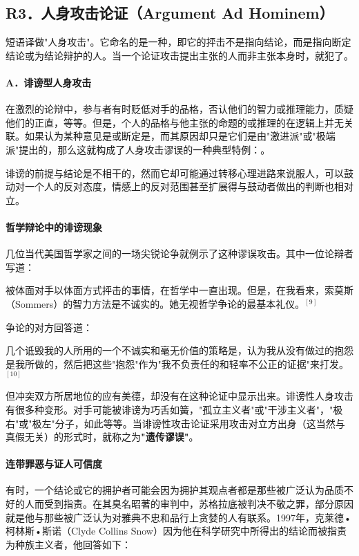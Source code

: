 \subsection{R3．人身攻击论证（Argument Ad Hominem）}

\begin{theorembox}[title=人身攻击论证的定义]
短语译做"人身攻击"。它命名的是一种，即它的抨击不是指向结论，而是指向断定结论或为结论辩护的人。当一个论证攻击提出主张的人而非主张本身时，就犯了。
\end{theorembox}

\paragraph{A．诽谤型人身攻击}

在激烈的论辩中，参与者有时贬低对手的品格，否认他们的智力或推理能力，质疑他们的正直，等等。但是，个人的品格与他主张的命题的或推理的在逻辑上并无关联。如果认为某种意见是或断定是，而其原因却只是它们是由"激进派"或"极端派"提出的，那么这就构成了人身攻击谬误的一种典型特例：。

诽谤的前提与结论是不相干的，然而它却可能通过转移心理进路来说服人，可以鼓动对一个人的反对态度，情感上的反对范围甚至扩展得与鼓动者做出的判断也相对立。

\paragraph{哲学辩论中的诽谤现象}
几位当代美国哲学家之间的一场尖锐论争就例示了这种谬误攻击。其中一位论辩者写道：

被体面对手以体面方式抨击的事情，在哲学中一直出现。但是，在我看来，索莫斯（Sommers）的智力方法是不诚实的。她无视哲学争论的最基本礼仪。${ }^{[9]}$

争论的对方回答道：

几个诋毁我的人所用的一个不诚实和毫无价值的策略是，认为我从没有做过的抱怨是我所做的，然后把这些"抱怨"作为"我不负责任的和轻率不公正的证据"来打发。${ }^{[10]}$

但冲突双方所居地位的应有美德，却没有在这种论证中显示出来。诽谤性人身攻击有很多种变形。对手可能被诽谤为巧舌如簧，"孤立主义者"或"干涉主义者"，"极右"或"极左"分子，如此等等。当诽谤性攻击论证采用攻击对立方出身（这当然与真假无关）的形式时，就称之为\textbf{"遗传谬误"}。

\paragraph{连带罪恶与证人可信度}
有时，一个结论或它的拥护者可能会因为拥护其观点者都是那些被广泛认为品质不好的人而受到指责。在其臭名昭著的审判中，苏格拉底被判决不敬之罪，部分原因就是他与那些被广泛认为对雅典不忠和品行上贪婪的人有联系。1997年，克莱德•柯林斯•斯诺（Clyde Collins Snow）因为他在科学研究中所得出的结论而被指责为种族主义者，他回答如下：

